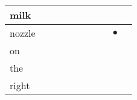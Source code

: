 \documentclass[landscape]{article}
\newcommand{\ssp}{\hspace{2pt}}
\newcommand{\mex}{\cellcolor{g}$\bullet$}
\begin{document}
\begin{tabular}{|l|p{10pt}|p{10pt}|p{10pt}|p{10pt}|p{10pt}|p{10pt}|p{10pt}|p{10pt}|p{10pt}|}
\hline
\ssp milk \ssp&\hspace{2pt}&\hspace{2pt}&\hspace{2pt}&\hspace{2pt}&\hspace{2pt}&\hspace{2pt}&\hspace{2pt}&\hspace{2pt}&\hspace{2pt}\\
\hline
\ssp \cellcolor{ref7}nozzle \ssp&\hspace{2pt}&\hspace{2pt}&\hspace{2pt}&\hspace{2pt}&\hspace{2pt}&\hspace{2pt}&\hspace{2pt}&\hspace{2pt}\mex&\hspace{2pt}\\
\hline
\ssp on \ssp&\hspace{2pt}&\hspace{2pt}&\hspace{2pt}&\hspace{2pt}&\hspace{2pt}&\hspace{2pt}&\hspace{2pt}&\hspace{2pt}&\hspace{2pt}\\
\hline
\ssp the \ssp&\hspace{2pt}&\hspace{2pt}&\hspace{2pt}&\hspace{2pt}&\hspace{2pt}&\hspace{2pt}&\hspace{2pt}&\hspace{2pt}&\hspace{2pt}\\
\hline
\ssp right \ssp&\hspace{2pt}&\hspace{2pt}&\hspace{2pt}&\hspace{2pt}&\hspace{2pt}&\hspace{2pt}&\hspace{2pt}&\hspace{2pt}&\hspace{2pt}\\

\end{tabular}
\end{document}
